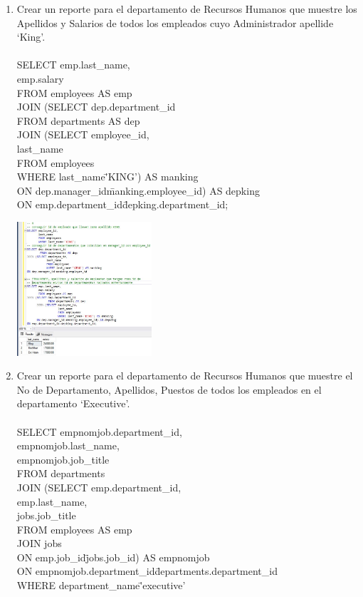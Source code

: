 \begin{enumerate}[1.]
	\item Crear un reporte para el departamento de Recursos Humanos que muestre los Apellidos y Salarios de todos los empleados cuyo Administrador apellide ‘King’.
	\\
	\\SELECT emp.last\_name, \\
	   emp.salary \\
	   FROM employees AS emp \\
	JOIN (SELECT dep.department\_id \\
			 FROM departments AS dep \\
	  JOIN (SELECT employee\_id, \\
			       last\_name \\
				   FROM employees \\
				   WHERE last\_name\='KING') AS manking \\
	  ON dep.manager\_id\=manking.employee\_id) AS depking \\
	ON emp.department\_id\=depking.department\_id; \\
	\begin{center}
	\includegraphics[width=5cm]{./Imagenes/actividad0906} 
	\end{center}

	\item Crear un reporte para el departamento de Recursos Humanos que muestre el No de Departamento, Apellidos, Puestos de todos los empleados en el departamento ‘Executive’.
	\\
	\\SELECT empnomjob.department\_id, \\
	   empnomjob.last\_name, \\
	   empnomjob.job\_title \\
	   FROM departments \\
	JOIN (SELECT emp.department\_id, \\
			 emp.last\_name, \\
			 jobs.job\_title \\
			 FROM employees AS emp \\
	  JOIN jobs \\
	  ON emp.job\_id\=jobs.job\_id) AS empnomjob \\
	ON empnomjob.department\_id\=departments.department\_id \\
	WHERE department\_name\='executive' \\


\end{enumerate}
